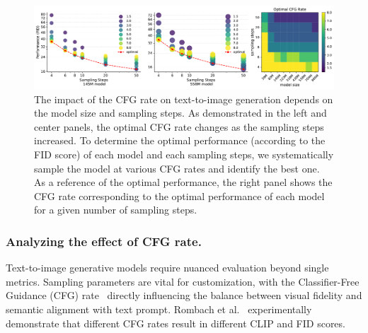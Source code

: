 \begin{figure}[t]
    \centering
    \includegraphics[width=\linewidth]{cp2/figures/analyze_cfg_rates_v4.pdf}
    \vspace{-1.5\baselineskip}
    \caption{
    The impact of the CFG rate on text-to-image generation depends on the model size and sampling steps. As demonstrated in the left and center panels, the optimal CFG rate changes as the sampling steps increased.
    To determine the optimal performance (according to the FID score) of each model and each sampling steps, we systematically sample the model at various CFG rates and identify the best one. As a reference of the optimal performance, the right panel shows the CFG rate corresponding to the optimal performance of each model for a given number of sampling steps.
    }
    \label{fig:cfgrate}
\end{figure}

\subsubsection{Analyzing the effect of CFG rate.}
\label{sec:optimalparams}


Text-to-image generative models require nuanced evaluation beyond single metrics. Sampling parameters are vital for customization, with the Classifier-Free Guidance (CFG) rate~\cite{ho2022classifier} directly influencing the balance between visual fidelity and semantic alignment with text prompt. Rombach et al.~\cite{rombach2022high} experimentally demonstrate that different CFG rates result in different CLIP and FID scores.


